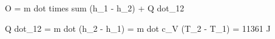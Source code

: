 O = m dot times sum (h_1 - h_2) + Q dot_12  

Q dot_12 = m dot (h_2 - h_1) = m dot c_V (T_2 - T_1) = 11361 J